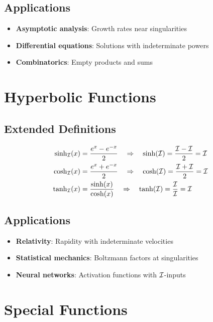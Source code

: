 \subsection*{Applications}

\begin{itemize}
    \item \textbf{Asymptotic analysis}: Growth rates near singularities
    \item \textbf{Differential equations}: Solutions with indeterminate powers
    \item \textbf{Combinatorics}: Empty products and sums
\end{itemize}

\section*{Hyperbolic Functions}

\subsection*{Extended Definitions}

\begin{definition}
\begin{align*}
\sinh_{\mathcal{I}}(x) &= \frac{e^x - e^{-x}}{2} \quad \Rightarrow \quad \sinh(\mathcal{I}) = \frac{\mathcal{I} - \mathcal{I}}{2} = \mathcal{I} \\
\cosh_{\mathcal{I}}(x) &= \frac{e^x + e^{-x}}{2} \quad \Rightarrow \quad \cosh(\mathcal{I}) = \frac{\mathcal{I} + \mathcal{I}}{2} = \mathcal{I} \\
\tanh_{\mathcal{I}}(x) &= \frac{\sinh(x)}{\cosh(x)} \quad \Rightarrow \quad \tanh(\mathcal{I}) = \frac{\mathcal{I}}{\mathcal{I}} = \mathcal{I}
\end{align*}
\end{definition}

\subsection*{Applications}

\begin{itemize}
    \item \textbf{Relativity}: Rapidity with indeterminate velocities
    \item \textbf{Statistical mechanics}: Boltzmann factors at singularities
    \item \textbf{Neural networks}: Activation functions with $\mathcal{I}$-inputs
\end{itemize}

\section*{Special Functions}

